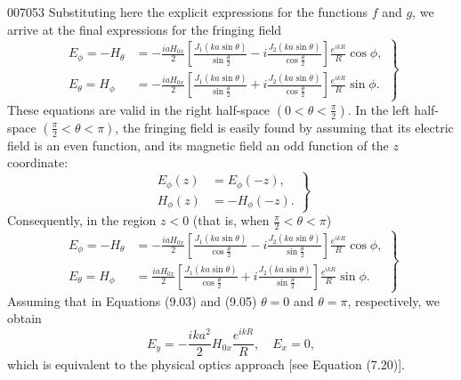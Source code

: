 \begin{scanpage}{0070}{53}
Substituting here the explicit expressions for the functions $f$ and $g$, we arrive at the final expressions for the fringing field
\[\left.\begin{aligned}E_\phi=-H_\theta&=-\frac{iaH_{0x}}2\left[\frac{J_1(ka\sin\theta)}{\sin\frac\theta2}-i\frac{J_2(ka\sin\theta)}{\cos\frac\theta2}\right]\frac{e^{ikR}}R\cos\phi,\\E_\theta=H_\phi&=-\frac{iaH_{0x}}2\left[\frac{J_1(ka\sin\theta)}{\sin\frac\theta2}+i\frac{J_2(ka\sin\theta)}{\cos\frac\theta2}\right]\frac{e^{ikR}}R\sin\phi.\end{aligned}\right\}\tag{9.03}\]
These equations are valid in the right half-space $\left(0<\theta<\frac\pi2\right)$. In the left half-space $\left(\frac\pi2<\theta<\pi\right)$, the fringing field is easily found by assuming that its electric field is an even function, and its magnetic field an odd function of the $z$ coordinate:
\[\left.\begin{aligned}E_\phi(z)&=E_\phi(-z),\\H_\phi(z)&=-H_\phi(-z).\end{aligned}\right\}\tag{9.04}\]
Consequently, in the region $z<0$ (that is, when $\frac\pi2<\theta<\pi$)
\[\left.\begin{aligned}E_\phi=-H_\theta&=-\frac{iaH_{0x}}2\left[\frac{J_1(ka\sin\theta)}{\cos\frac\theta2}-i\frac{J_2(ka\sin\theta)}{\sin\frac\theta2}\right]\frac{e^{ikR}}R\cos\phi,\\E_\theta=H_\phi&=\frac{iaH_{0x}}2\left[\frac{J_1(ka\sin\theta)}{\cos\frac\theta2}+i\frac{J_2(ka\sin\theta)}{\sin\frac\theta2}\right]\frac{e^{ikR}}R\sin\phi.\end{aligned}\right\}\tag{9.05}\]
Assuming that in Equations (9.03) and (9.05) $\theta=0$ and $\theta=\pi$, respectively, we obtain
\[E_y=-\frac{ika^2}2H_{0x}\frac{e^{ikR}}R,\quad E_x=0,\tag{9.06}\]
which is equivalent to the physical optics approach [see Equation (7.20)].
\end{scanpage}
